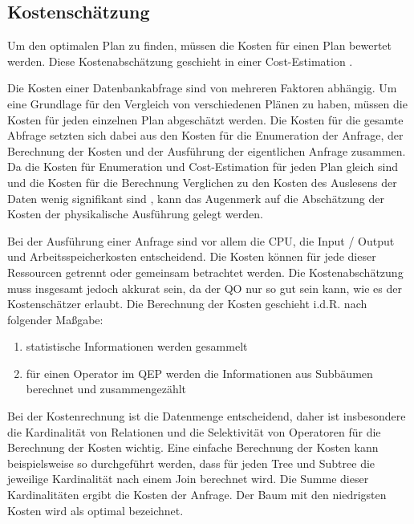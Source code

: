 \subsection{Kostenschätzung}

Um den optimalen Plan zu finden, müssen die Kosten für einen Plan bewertet werden. Diese Kostenabschätzung geschieht in einer Cost-Estimation \cite{bruno2011automated}. 

Die Kosten einer Datenbankabfrage sind von mehreren Faktoren abhängig. Um eine Grundlage für den Vergleich von verschiedenen Plänen zu haben, müssen die Kosten für jeden einzelnen Plan abgeschätzt werden. Die Kosten für die gesamte Abfrage setzten sich dabei aus den Kosten für die Enumeration der Anfrage, der Berechnung der Kosten und der Ausführung der eigentlichen Anfrage zusammen. Da die Kosten für Enumeration und Cost-Estimation für jeden Plan gleich sind und die Kosten für die Berechnung Verglichen zu den Kosten des Auslesens der Daten wenig signifikant sind \cite{selinger1979access}, kann das Augenmerk auf die Abschätzung der Kosten der physikalische Ausführung gelegt werden.

Bei der Ausführung einer Anfrage sind vor allem die CPU, die Input / Output und Arbeitsspeicherkosten entscheidend. Die Kosten können für jede dieser Ressourcen getrennt oder gemeinsam betrachtet werden. Die Kostenabschätzung muss insgesamt jedoch akkurat sein, da der \ac{QO} nur so gut sein kann, wie es der Kostenschätzer erlaubt. Die Berechnung der Kosten geschieht i.d.R. nach folgender Maßgabe:

\begin{enumerate}
\item statistische Informationen werden gesammelt
\item für einen Operator im \ac{QEP} werden die Informationen aus Subbäumen berechnet und zusammengezählt
\end{enumerate}

Bei der Kostenrechnung ist die Datenmenge entscheidend, daher ist insbesondere die Kardinalität von Relationen und die Selektivität von Operatoren für die Berechnung der Kosten wichtig. Eine einfache Berechnung der Kosten kann beispielsweise so durchgeführt werden, dass für jeden Tree und Subtree die jeweilige Kardinalität nach einem Join berechnet wird. Die Summe dieser Kardinalitäten ergibt die Kosten der Anfrage. Der Baum mit den niedrigsten Kosten wird als optimal bezeichnet.